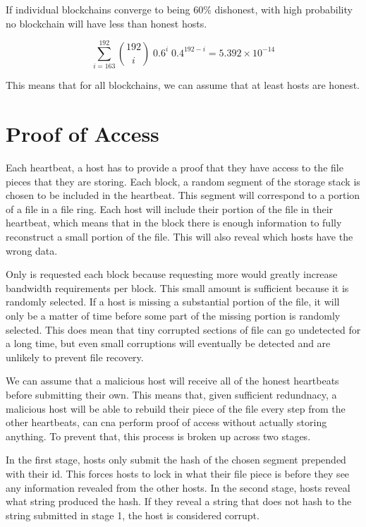 \documentclass[twocolumn]{article}
\begin{document}
If individual blockchains converge to being 60\% dishonest, with high probability no blockchain will have less than \inversemaxcorruption{} honest hosts.

\begin{equation}
\sum_{i=163}^{192} {192 \choose i} \; 0.6^{i} \; 0.4^{192-i} = 5.392\times10^{-14}
\end{equation}

This means that for all blockchains, we can assume that at least \inversemaxcorruption{} hosts are honest.

\section{Proof of Access}

Each heartbeat, a host has to provide a proof that they have access to the file pieces that they are storing.
Each block, a random \filechecksize{} segment of the storage stack is chosen to be included in the heartbeat.
This segment will correspond to a portion of a file in a file ring.
Each host will include their portion of the file in their heartbeat, which means that in the block there is enough information to fully reconstruct a small portion of the file.
This will also reveal which hosts have the wrong data.

Only \filechecksize{} is requested each block because requesting more would greatly increase bandwidth requirements per block.
This small amount is sufficient because it is randomly selected.
If a host is missing a substantial portion of the file, it will only be a matter of time before some part of the missing portion is randomly selected.
This does mean that tiny corrupted sections of file can go undetected for a long time, but even small corruptions will eventually be detected and are unlikely to prevent file recovery.

We can assume that a malicious host will receive all of the honest heartbeats before submitting their own.
This means that, given sufficient redundnacy, a malicious host will be able to rebuild their piece of the file every step from the other heartbeats, can cna perform proof of access without actually storing anything.
To prevent that, this process is broken up across two stages.

In the first stage, hosts only submit the hash of the chosen segment prepended with their id.
This forces hosts to lock in what their file piece is before they see any information revealed from the other hosts.
In the second stage, hosts reveal what string produced the hash.
If they reveal a string that does not hash to the string submitted in stage 1, the host is considered corrupt.
\end{document}
